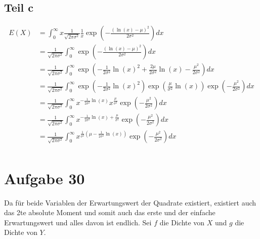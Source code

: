 \documentclass[10pt,a4paper]{article}
\begin{document}
\subsection{Teil c}
\begin{align*}
  E(X) & = \int_{0}^{\infty} x \frac{1}{\sqrt{2\pi\sigma^{2}}}\frac{1}{x}\exp \left( -\frac{(\ln(x) - \mu)^{2}}{2\sigma^{2}} \right) dx\\
  & = \frac{1}{\sqrt{2\pi\sigma^{2}}} \int_{0}^{\infty} \exp \left( -\frac{(\ln(x) - \mu)^{2}}{2\sigma^{2}} \right) dx\\
  & = \frac{1}{\sqrt{2\pi\sigma^{2}}} \int_{0}^{\infty} \exp \left( -\frac{1}{2\sigma^{2}}\ln(x)^{2} + \frac{2\mu}{2\sigma^{2}}\ln(x) - \frac{\mu^{2}}{2\sigma^{2}} \right) dx\\
  & = \frac{1}{\sqrt{2\pi\sigma^{2}}} \int_{0}^{\infty} \exp \left( -\frac{1}{2\sigma^{2}}\ln(x)^{2} \right) \exp \left( \frac{\mu}{\sigma^{2}}\ln(x) \right) \exp \left( -\frac{\mu^{2}}{2\sigma^{2}} \right) dx\\
  & = \frac{1}{\sqrt{2\pi\sigma^{2}}} \int_{0}^{\infty} x^{-\frac{1}{2\sigma^{2}}\ln(x)} x^{\frac{\mu}{\sigma^{2}}} \exp \left( -\frac{\mu^{2}}{2\sigma^{2}} \right) dx\\
  & = \frac{1}{\sqrt{2\pi\sigma^{2}}} \int_{0}^{\infty} x^{-\frac{1}{2\sigma^{2}}\ln(x) + \frac{\mu}{\sigma^{2}}} \exp \left( -\frac{\mu^{2}}{2\sigma^{2}} \right) dx\\
  & = \frac{1}{\sqrt{2\pi\sigma^{2}}} \int_{0}^{\infty} x^{\frac{1}{\sigma^{2}} \left( \mu - \frac{1}{2\sigma^{2}}\ln(x) \right)} \exp \left( -\frac{\mu^{2}}{2\sigma^{2}} \right) dx\\
\end{align*}

\section{Aufgabe 30}
Da für beide Variablen der Erwartungswert der Quadrate existiert, existiert auch das 2te absolute Moment und somit auch das erste und der einfache Erwartungswert und alles davon ist endlich.
Sei $f$ die Dichte von $X$ und $g$ die Dichte von $Y$.
\end{document}
